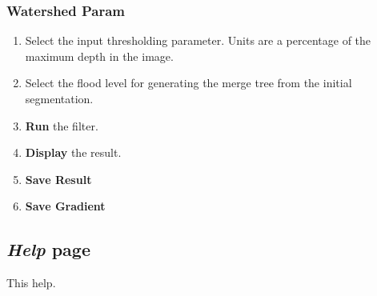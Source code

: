 \documentclass{article}
\begin{document}
\subsubsection{Watershed Param}
\begin{enumerate}
  \item Select the input thresholding parameter. Units are a percentage of the maximum depth in the image.
  \item Select the flood level for generating the merge tree from the initial segmentation.
  \item {\bf Run} the filter.
  \item {\bf Display} the result.
  \item {\bf Save Result}
  \item {\bf Save Gradient}
\end{enumerate}


\subsection{\emph{Help} page}
This help.
\end{document}
